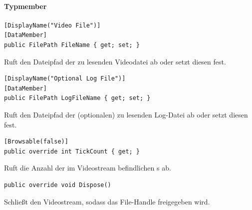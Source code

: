 \paragraph{Typmember}
\begin{itemize}

        \begin{verbatim}
[DisplayName("Video File")]
[DataMember]
public FilePath FileName { get; set; }
        \end{verbatim}
	Ruft den Dateipfad der zu lesenden Videodatei ab oder setzt diesen fest.

        \begin{verbatim}
[DisplayName("Optional Log File")]
[DataMember]
public FilePath LogFileName { get; set; }
        \end{verbatim}
	Ruft den Dateipfad der (optionalen) zu lesenden Log-Datei ab oder setzt diesen fest.

        \begin{verbatim}
[Browsable(false)]
public override int TickCount { get; }
        \end{verbatim}
	Ruft die Anzahl der im Videostream befindlichen s ab.

        \begin{verbatim}
public override void Dispose()
        \end{verbatim}
Schließt den Videostream, sodass das File-Handle freigegeben wird.


\end{itemize}
